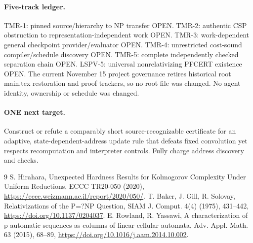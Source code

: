 \documentclass[10pt]{article}
\begin{document}
\paragraph{Five-track ledger.}
TMR-1: pinned source/hierarchy to NP transfer OPEN.
TMR-2: authentic CSP obstruction to representation-independent work OPEN.
TMR-3: work-dependent general checkpoint provider/evaluator OPEN.
TMR-4: unrestricted cost-sound compiler/schedule discovery OPEN.
TMR-5: complete independently checked separation chain OPEN.
LSPV-5: universal nonrelativizing PFCERT existence OPEN.
The current November 15 project governance retires historical root
main.tex restoration and proof trackers, so no root file was changed.
No agent identity, ownership or schedule was changed.

\paragraph{ONE next target.}
Construct or refute a comparably short source-recognizable
certificate for an adaptive, state-dependent-address update rule
that defeats fixed convolution yet respects recomputation and
interpreter controls. Fully charge address discovery and checks.

\begin{thebibliography}{9}
 S. Hirahara, Unexpected Hardness Results for Kolmogorov
Complexity Under Uniform Reductions, ECCC TR20-050 (2020),
\url{https://eccc.weizmann.ac.il/report/2020/050/}.
 T. Baker, J. Gill, R. Solovay, Relativizations of the P=?NP
Question, SIAM J. Comput. 4(4) (1975), 431--442,
\url{https://doi.org/10.1137/0204037}.
 E. Rowland, R. Yassawi, A characterization of
p-automatic sequences as columns of linear cellular automata,
Adv. Appl. Math. 63 (2015), 68--89,
\url{https://doi.org/10.1016/j.aam.2014.10.002}.
\end{thebibliography}
\end{document}
